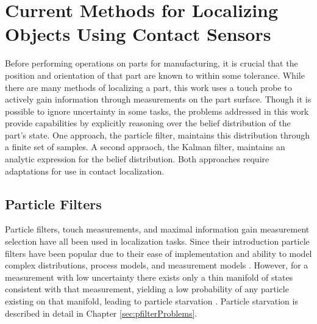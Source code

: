\documentclass[../thesis.tex]{subfiles}
\begin{document}
\section{Current Methods for Localizing Objects Using Contact Sensors}

Before performing operations on parts for manufacturing, it is crucial that the position and orientation of that part are known to within some tolerance.
While there are many methods of localizing a part, this work uses a touch probe to actively gain information through measurements on the part surface.
Though it is possible to ignore uncertainty in some tasks, the problems addressed in this work provide capabilities by explicitly reasoning over the belief distribution of the part's state.
One approach, the particle filter, maintains this distribution through a finite set of samples.
A second appraoch, the Kalman filter, maintains an analytic expression for the belief distribution.
Both approaches require adaptations for use in contact localization.





\subsection{Particle Filters}
Particle filters, touch measurements, and maximal information gain measurement selection have all been used in localization tasks. 
Since their introduction particle filters have been popular due to their ease of implementation and ability to model complex distributions, process models, and measurement models \cite{Thrun2000a}. 
However, for a measurement with low uncertainty there exists only a thin manifold of states consistent with that measurement, yielding a low probability of any particle existing on that manifold, leading to particle starvation \cite{Thrun2000}.
Particle starvation is described in detail in Chapter \ref{sec:pfilterProblems}.
\end{document}
